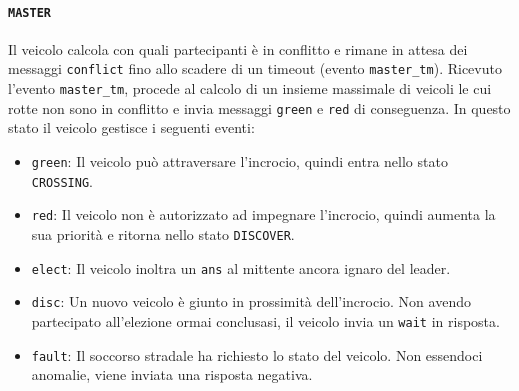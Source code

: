 \documentclass{memoir}
\begin{document}
\begin{figure}[h]
  \centering
\end{figure}

\paragraph{\texttt{MASTER}}
Il veicolo calcola con quali partecipanti è in conflitto e rimane in attesa dei
messaggi \texttt{conflict} fino allo scadere di un timeout (evento
\texttt{master\_tm}). Ricevuto l'evento \texttt{master\_tm}, procede al calcolo
di un insieme massimale di veicoli le cui rotte non sono in conflitto e invia
messaggi \texttt{green} e \texttt{red} di conseguenza. In questo stato il
veicolo gestisce i seguenti eventi:
\begin{itemize}
\item \texttt{green}: Il veicolo può attraversare l'incrocio, quindi entra nello
  stato \texttt{CROSSING}.
\item \texttt{red}: Il veicolo non è autorizzato ad impegnare l'incrocio, quindi
  aumenta la sua priorità e ritorna nello stato \texttt{DISCOVER}.
\item \texttt{elect}: Il veicolo inoltra un \texttt{ans} al mittente ancora
  ignaro del leader.
\item \texttt{disc}: Un nuovo veicolo è giunto in prossimità dell'incrocio. Non
  avendo partecipato all'elezione ormai conclusasi, il veicolo invia un
  \texttt{wait} in risposta.
\item \texttt{fault}: Il soccorso stradale ha richiesto lo stato del veicolo.
  Non essendoci anomalie, viene inviata una risposta negativa.
\end{itemize}
\end{document}
